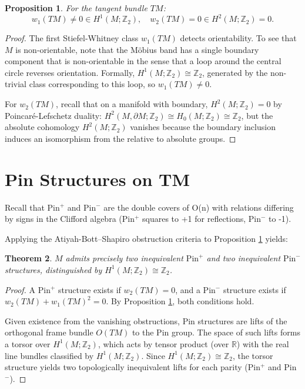 \documentclass[11pt]{amsart}
\newtheorem{theorem}{Theorem}[section]
\newtheorem{proposition}[theorem]{Proposition}
\theoremstyle{definition}
\theoremstyle{remark}
\newcommand{\ZZ}{\mathbb{Z}}
\begin{document}
\begin{proposition}\label{prop:SWclasses}
For the tangent bundle $TM$:
\[
w_1(TM)\neq0\in H^1(M;\ZZ_2), \quad
w_2(TM)=0\in H^2(M;\ZZ_2)=0.
\]
\end{proposition}

\begin{proof}
The first Stiefel-Whitney class $w_1(TM)$ detects orientability.  To see that $M$ is non-orientable, note that the Möbius band has a single boundary component that is non-orientable in the sense that a loop around the central circle reverses orientation.  Formally, $H^1(M;\ZZ_2) \cong \ZZ_2$, generated by the non-trivial class corresponding to this loop, so $w_1(TM) \neq 0$.

For $w_2(TM)$, recall that on a manifold with boundary, $H^2(M;\ZZ_2) = 0$ by Poincaré-Lefschetz duality: $H^2(M, \partial M; \ZZ_2) \cong H_0(M; \ZZ_2) \cong \ZZ_2$, but the absolute cohomology $H^2(M;\ZZ_2)$ vanishes because the boundary inclusion induces an isomorphism from the relative to absolute groups.
\end{proof}

\section{Pin Structures on TM}\label{sec:Pin}

Recall that Pin$^+$ and Pin$^-$ are the double covers of O(n) with relations differing by signs in the Clifford algebra (Pin$^+$ squares to +1 for reflections, Pin$^-$ to -1).

Applying the Atiyah-Bott–Shapiro obstruction criteria \cite{ABS} to Proposition \ref{prop:SWclasses} yields:

\begin{theorem}\label{thm:PinCount}
$M$ admits precisely two inequivalent $\mathrm{Pin}^{+}$ and two inequivalent $\mathrm{Pin}^{-}$ structures, distinguished by $H^1(M;\ZZ_2)\cong\ZZ_2$.
\end{theorem}

\begin{proof}
A Pin$^+$ structure exists if $w_2(TM) = 0$, and a Pin$^-$ structure exists if $w_2(TM) + w_1(TM)^2 = 0$. By Proposition \ref{prop:SWclasses}, both conditions hold.

Given existence from the vanishing obstructions, Pin structures are lifts of the orthogonal frame bundle $O(TM)$ to the Pin group. The space of such lifts forms a torsor over $H^1(M; \ZZ_2)$, which acts by tensor product (over $\mathbb{R}$) with the real line bundles classified by $H^1(M; \ZZ_2)$. Since $H^1(M; \ZZ_2) \cong \ZZ_2$, the torsor structure yields two topologically inequivalent lifts for each parity (Pin$^+$ and Pin$^-$).
\end{proof}
\end{document}
